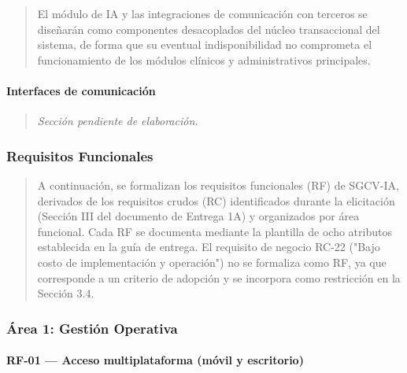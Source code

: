 \documentclass[
]{article}
\begin{document}
\begin{quote}
El módulo de IA y las integraciones de comunicación con terceros se
diseñarán como componentes desacoplados del núcleo transaccional del
sistema, de forma que su eventual indisponibilidad no comprometa el
funcionamiento de los módulos clínicos y administrativos principales.
\end{quote}

\paragraph{Interfaces de
comunicación}\label{interfaces-de-comunicaciuxf3n}

\begin{quote}
\emph{Sección pendiente de elaboración.}
\end{quote}

\subsubsection{Requisitos Funcionales}\label{requisitos-funcionales}

\begin{quote}
A continuación, se formalizan los requisitos funcionales (RF) de
SGCV-IA, derivados de los requisitos crudos (RC) identificados durante
la elicitación (Sección III del documento de Entrega 1A) y organizados
por área funcional. Cada RF se documenta mediante la plantilla de ocho
atributos establecida en la guía de entrega. El requisito de negocio
RC-22 ("Bajo costo de implementación y operación") no se formaliza como
RF, ya que corresponde a un criterio de adopción y se incorpora como
restricción en la Sección 3.4.
\end{quote}

\subsubsection{Área 1: Gestión
Operativa}\label{uxe1rea-1-gestiuxf3n-operativa}

\paragraph{RF-01 --- Acceso multiplataforma (móvil y
escritorio)}\label{rf-01-acceso-multiplataforma-muxf3vil-y-escritorio}
\end{document}
